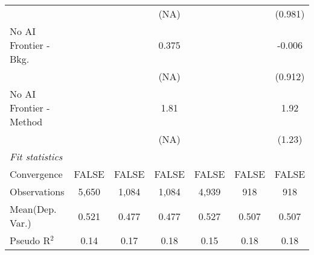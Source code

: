 \begin{tabular}{lcccccc}
                           &               &              & (NA)  &              &             & (0.981)\\   
   No AI Frontier - Bkg.   &               &              & 0.375 &              &             & -0.006\\   
                           &               &              & (NA)  &              &             & (0.912)\\   
   No AI Frontier - Method &               &              & 1.81  &              &             & 1.92\\   
                           &               &              & (NA)  &              &             & (1.23)\\   
   \midrule
   \emph{Fit statistics}\\
   Convergence             &FALSE          & FALSE        & FALSE & FALSE        & FALSE       & FALSE\\  
   Observations            & 5,650         & 1,084        & 1,084 & 4,939        & 918         & 918\\  
Mean(Dep. Var.) & 0.521 & 0.477 & 0.477 & 0.527 & 0.507 & 0.507 \\
   Pseudo R$^2$            & 0.14          & 0.17         & 0.18  & 0.15         & 0.18        & 0.18\\  
   

\end{tabular}
